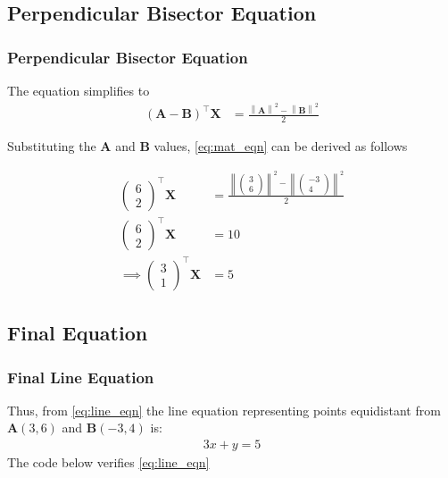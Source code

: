 \documentclass{beamer}
\providecommand{\brak}[1]{\ensuremath{\left(#1\right)}}
\theoremstyle{remark}
\providecommand{\norm}[1]{\left\lVert#1\right\rVert}
\newcommand{\myvec}[1]{\ensuremath{\begin{pmatrix}#1\end{pmatrix}}}
\let\vec\mathbf
\numberwithin{equation}{section}
\begin{document}
\subsection{Perpendicular Bisector Equation}
\begin{frame}
\frametitle{Perpendicular Bisector Equation}

The equation simplifies to
\begin{align}
        \label{eq:mat_eqn}
	\brak{\vec{A} - \vec{B}}^\top \vec{X} &= \frac{\norm{\vec{A}}^2 - \norm{\vec{B}}^2}{2}
\end{align}

Substituting the $\vec{A}$ and $\vec{B}$ values, \eqref{eq:mat_eqn} can be derived as follows

\begin{align}
    \myvec{6 \\ 2}^\top \vec{X} &= \frac{\norm{\myvec{3 \\ 6}}^2-\norm{\myvec{-3 \\ 4}}^2}{2} \\
    \myvec{6 \\ 2}^\top \vec{X} &= 10 \\
    \label{eq:line_eqn} \implies \myvec{3 \\ 1}^\top \vec{X} &= 5
\end{align}
\end{frame}

\subsection{Final Equation}
\begin{frame}
\frametitle{Final Line Equation}
Thus, from \eqref{eq:line_eqn} the line equation representing points equidistant from $\vec{A}(3, 6)$ and $\vec{B}(-3, 4)$ is:
\begin{align}
	3x + y = 5
\end{align}
The code below verifies \eqref{eq:line_eqn}
\end{frame}



\end{document}
